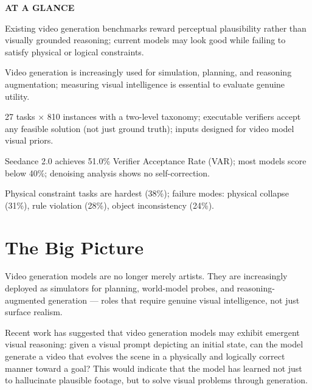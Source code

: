 \documentclass[10pt,twocolumn]{article}
\begin{document}
\begin{mdframed}[backgroundcolor=boxgray,linecolor=rulered,linewidth=1pt,
    innerleftmargin=6pt,innerrightmargin=6pt,
    innertopmargin=6pt,innerbottommargin=6pt]
\textbf{\small AT A GLANCE}\par\vspace{4pt}
\begin{description}[leftmargin=0pt,labelsep=4pt,itemsep=2pt,parsep=0pt,
    font=\small\bfseries]
  \item[Problem:] Existing video generation benchmarks reward perceptual
    plausibility rather than visually grounded reasoning; current models
    may look good while failing to satisfy physical or logical constraints.
  \item[Why it matters:] Video generation is increasingly used for
    simulation, planning, and reasoning augmentation; measuring visual
    intelligence is essential to evaluate genuine utility.
  \item[Method:] 27 tasks $\times$ 810 instances with a two-level taxonomy;
    executable verifiers accept any feasible solution (not just ground truth);
    inputs designed for video model visual priors.
  \item[Result:] Seedance 2.0 achieves 51.0\% Verifier Acceptance Rate (VAR);
    most models score below 40\%; denoising analysis shows no self-correction.
  \item[Evidence:] Physical constraint tasks are hardest (38\%);
    failure modes: physical collapse (31\%), rule violation (28\%),
    object inconsistency (24\%).
\end{description}
\end{mdframed}

\section{The Big Picture}

Video generation models are no longer merely artists. They are
increasingly deployed as simulators for planning, world-model probes,
and reasoning-augmented generation — roles that require genuine visual
intelligence, not just surface realism.

Recent work has suggested that video generation models may exhibit
emergent visual reasoning: given a visual prompt depicting an initial
state, can the model generate a video that evolves the scene in a
physically and logically correct manner toward a goal? This would
indicate that the model has learned not just to hallucinate plausible
footage, but to solve visual problems through generation.
\end{document}
